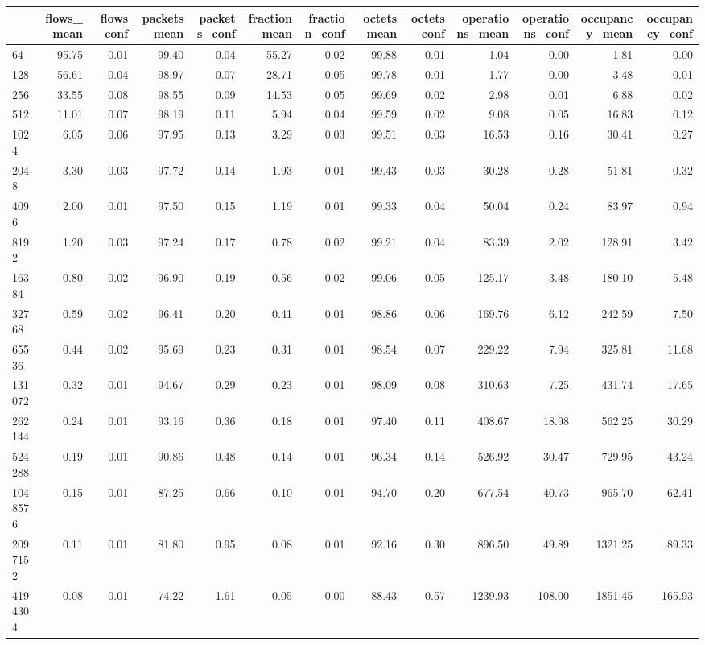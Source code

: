 \begin{tabular}{lrrrrrrrrrrrr}
\toprule
 & flows_mean & flows_conf & packets_mean & packets_conf & fraction_mean & fraction_conf & octets_mean & octets_conf & operations_mean & operations_conf & occupancy_mean & occupancy_conf \\
\midrule
64 & 95.75 & 0.01 & 99.40 & 0.04 & 55.27 & 0.02 & 99.88 & 0.01 & 1.04 & 0.00 & 1.81 & 0.00 \\
128 & 56.61 & 0.04 & 98.97 & 0.07 & 28.71 & 0.05 & 99.78 & 0.01 & 1.77 & 0.00 & 3.48 & 0.01 \\
256 & 33.55 & 0.08 & 98.55 & 0.09 & 14.53 & 0.05 & 99.69 & 0.02 & 2.98 & 0.01 & 6.88 & 0.02 \\
512 & 11.01 & 0.07 & 98.19 & 0.11 & 5.94 & 0.04 & 99.59 & 0.02 & 9.08 & 0.05 & 16.83 & 0.12 \\
1024 & 6.05 & 0.06 & 97.95 & 0.13 & 3.29 & 0.03 & 99.51 & 0.03 & 16.53 & 0.16 & 30.41 & 0.27 \\
2048 & 3.30 & 0.03 & 97.72 & 0.14 & 1.93 & 0.01 & 99.43 & 0.03 & 30.28 & 0.28 & 51.81 & 0.32 \\
4096 & 2.00 & 0.01 & 97.50 & 0.15 & 1.19 & 0.01 & 99.33 & 0.04 & 50.04 & 0.24 & 83.97 & 0.94 \\
8192 & 1.20 & 0.03 & 97.24 & 0.17 & 0.78 & 0.02 & 99.21 & 0.04 & 83.39 & 2.02 & 128.91 & 3.42 \\
16384 & 0.80 & 0.02 & 96.90 & 0.19 & 0.56 & 0.02 & 99.06 & 0.05 & 125.17 & 3.48 & 180.10 & 5.48 \\
32768 & 0.59 & 0.02 & 96.41 & 0.20 & 0.41 & 0.01 & 98.86 & 0.06 & 169.76 & 6.12 & 242.59 & 7.50 \\
65536 & 0.44 & 0.02 & 95.69 & 0.23 & 0.31 & 0.01 & 98.54 & 0.07 & 229.22 & 7.94 & 325.81 & 11.68 \\
131072 & 0.32 & 0.01 & 94.67 & 0.29 & 0.23 & 0.01 & 98.09 & 0.08 & 310.63 & 7.25 & 431.74 & 17.65 \\
262144 & 0.24 & 0.01 & 93.16 & 0.36 & 0.18 & 0.01 & 97.40 & 0.11 & 408.67 & 18.98 & 562.25 & 30.29 \\
524288 & 0.19 & 0.01 & 90.86 & 0.48 & 0.14 & 0.01 & 96.34 & 0.14 & 526.92 & 30.47 & 729.95 & 43.24 \\
1048576 & 0.15 & 0.01 & 87.25 & 0.66 & 0.10 & 0.01 & 94.70 & 0.20 & 677.54 & 40.73 & 965.70 & 62.41 \\
2097152 & 0.11 & 0.01 & 81.80 & 0.95 & 0.08 & 0.01 & 92.16 & 0.30 & 896.50 & 49.89 & 1321.25 & 89.33 \\
4194304 & 0.08 & 0.01 & 74.22 & 1.61 & 0.05 & 0.00 & 88.43 & 0.57 & 1239.93 & 108.00 & 1851.45 & 165.93 \\

\end{tabular}
